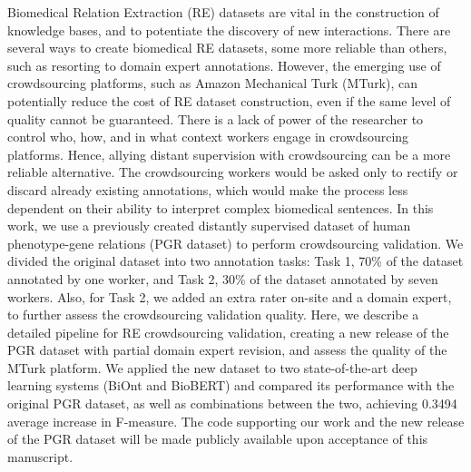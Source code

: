Biomedical Relation Extraction (RE) datasets are vital in the construction of knowledge bases, and to potentiate the discovery of new interactions. There are several ways to create biomedical RE datasets, some more reliable than others, such as resorting to domain expert annotations. However, the emerging use of crowdsourcing platforms, such as Amazon Mechanical Turk (MTurk), can potentially reduce the cost of RE dataset construction, even if the same level of quality cannot be guaranteed. There is a lack of power of the researcher to control who, how, and in what context workers engage in crowdsourcing platforms. Hence, allying distant supervision with crowdsourcing can be a more reliable alternative. The crowdsourcing workers would be asked only to rectify or discard already existing annotations, which would make the process less dependent on their ability to interpret complex biomedical sentences. In this work, we use a previously created distantly supervised dataset of human phenotype-gene relations (PGR dataset) to perform crowdsourcing validation. We divided the original dataset into two annotation tasks: Task 1, 70\% of the dataset annotated by one worker, and Task 2, 30\% of the dataset annotated by seven workers. Also, for Task 2, we added an extra rater on-site and a domain expert, to further assess the crowdsourcing validation quality. Here, we describe a detailed pipeline for RE crowdsourcing validation, creating a new release of the PGR dataset with partial domain expert revision, and assess the quality of the MTurk platform. We applied the new dataset to two state-of-the-art deep learning systems (BiOnt and BioBERT) and compared its performance with the original PGR dataset, as well as combinations between the two, achieving 0.3494 average increase in F-measure. The code supporting our work and the new release of the PGR dataset will be made publicly available upon acceptance of this manuscript.

